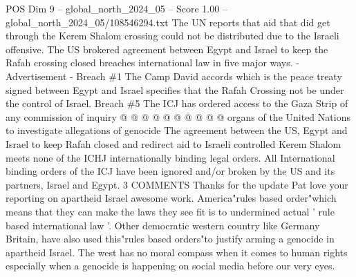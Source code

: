 \begin{textsample}{POS Dim 9 – global\_north\_2024\_05 – Score 1.00 – global\_north\_2024\_05/108546294.txt}
The UN reports that aid that did get through the Kerem Shalom crossing could not be distributed due to the Israeli offensive.
The US brokered agreement between Egypt and Israel to keep the Rafah crossing closed breaches international law in five major ways. - Advertisement - Breach \#1 The Camp David accords which is the peace treaty signed between Egypt and Israel specifies that the Rafah Crossing not be under the control of Israel.
Breach \#5 The ICJ has ordered access to the Gaza Strip of any commission of inquiry @ @ @ @ @ @ @ @ @ @ organs of the United Nations to investigate allegations of genocide The agreement between the US, Egypt and Israel to keep Rafah closed and redirect aid to Israeli controlled Kerem Shalom meets none of the ICHJ internationally binding legal orders.
All International binding orders of the ICJ have been ignored and/or broken by the US and its partners, Israel and Egypt. 3 COMMENTS Thanks for the update Pat love your reporting on apartheid Israel awesome work.
America"rules based order"which means that they can make the laws they see fit is to undermined actual ' rule based international law '.
Other democratic western country like Germany Britain, have also used this"rules based orders"to justify arming a genocide in apartheid Israel.
The west has no moral compass when it comes to human rights especially when a genocide is happening on social media before our very eyes.

\end{textsample}
